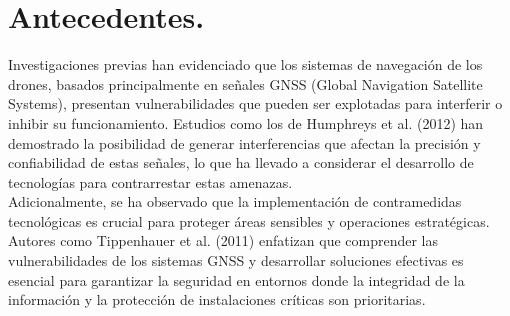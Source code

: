 \chapter*{Antecedentes.}

\begin{justify}
    
    Investigaciones previas han evidenciado que los sistemas de navegación de los drones, basados principalmente en señales GNSS
    (Global Navigation Satellite Systems), presentan vulnerabilidades que pueden ser explotadas para interferir o
    inhibir su funcionamiento. Estudios como los de Humphreys et al. (2012) han demostrado la posibilidad de generar interferencias
    que afectan la precisión y confiabilidad de estas señales, lo que ha llevado a considerar el desarrollo de tecnologías para
    contrarrestar estas amenazas.\\
    
    \noindent Adicionalmente, se ha observado que la implementación de contramedidas tecnológicas es crucial para proteger áreas sensibles y
    operaciones estratégicas. Autores como Tippenhauer et al. (2011) enfatizan que comprender las vulnerabilidades de los sistemas GNSS
    y desarrollar soluciones efectivas es esencial para garantizar la seguridad en entornos donde la integridad de la información y
    la protección de instalaciones críticas son prioritarias.

\end{justify}